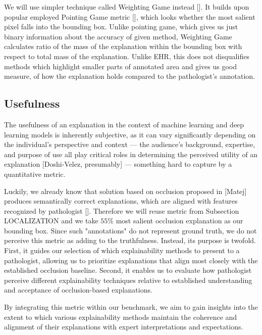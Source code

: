 We will use simpler technique called Weighting Game instead []. It builds upon popular employed Pointing Game metric [], which looks whether the most salient pixel falls into the bounding box. Unlike pointing game, which gives us just binary information about the accuracy of given method, Weighting Game calculates ratio of the mass of the explanation within the bounding box with respect to total mass of the explanation. Unlike EHR, this does not disqualifies methods which highlight smaller parts of annotated area and gives us good measure, of how the explanation holds compared to the pathologist's annotation.

\subsection*{Usefulness}

The usefulness of an explanation in the context of machine learning and deep learning models is inherently subjective, as it can vary significantly depending on the individual's perspective and context --- the audience's background, expertise, and purpose of use all play critical roles in determining the perceived utility of an explanation [Doshi-Velez, presumably] --- something hard to capture by a quantitative metric.

Luckily, we already know that solution based on occlusion proposed in [Matej] produces semantically correct explanations, which are aligned with features recognized by pathologist []. Therefore we will reuse metric from Subsection LOCALIZATION and we take $55$\% most salient occlusion explanation as our bounding box. Since such "annotations" do not represent ground truth, we do not perceive this metric as adding to the truthfulness. Instead, its purpose is twofold. First, it guides our selection of which explainability methods to present to a pathologist, allowing us to prioritize explanations that align most closely with the established occlusion baseline. Second, it enables us to evaluate how pathologist perceive different explainability techniques relative to established understanding and acceptance of occlusion-based explanations.

By integrating this metric within our benchmark, we aim to gain insights into the extent to which various explainability methods maintain the coherence and alignment of their explanations with expert interpretations and expectations.

